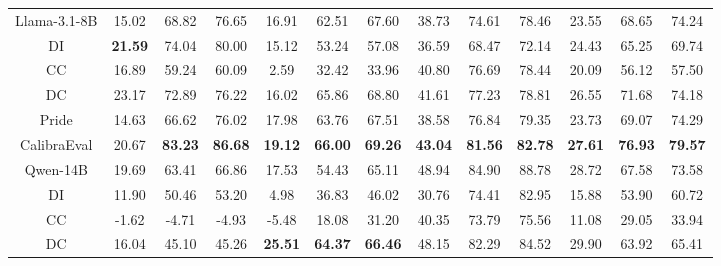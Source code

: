 \documentclass[sigconf]{acmart}
\begin{document}
\begin{table}[]
\begin{tabular}{c|ccc|ccc|ccc|ccc}
Llama-3.1-8B           & 15.02          & 68.82          & 76.65          & 16.91          & 62.51          & 67.60          & 38.73          & 74.61          & 78.46          & 23.55          & 68.65          & 74.24          \\
DI                     & \textbf{21.59} & 74.04          & 80.00          & 15.12          & 53.24          & 57.08          & 36.59          & 68.47          & 72.14          & 24.43          & 65.25          & 69.74          \\
CC                     & 16.89          & 59.24          & 60.09          & 2.59           & 32.42          & 33.96          & 40.80          & 76.69          & 78.44          & 20.09          & 56.12          & 57.50          \\
DC                     & 23.17          & 72.89          & 76.22          & 16.02          & 65.86          & 68.80          & 41.61          & 77.23          & 78.81          & 26.55          & 71.68          & 74.18          \\
Pride                  & 14.63          & 66.62          & 76.02          & 17.98          & 63.76          & 67.51          & 38.58          & 76.84          & 79.35          & 23.73          & 69.07          & 74.29          \\
CalibraEval            & 20.67          & \textbf{83.23} & \textbf{86.68} & \textbf{19.12} & \textbf{66.00} & \textbf{69.26} & \textbf{43.04} & \textbf{81.56} & \textbf{82.78} & \textbf{27.61} & \textbf{76.93} & \textbf{79.57} \\ \hline
Qwen-14B               & 19.69          & 63.41          & 66.86          & 17.53          & 54.43          & 65.11          & 48.94          & 84.90          & 88.78          & 28.72          & 67.58          & 73.58          \\
DI                     & 11.90          & 50.46          & 53.20          & 4.98           & 36.83          & 46.02          & 30.76          & 74.41          & 82.95          & 15.88          & 53.90          & 60.72          \\
CC                     & -1.62          & -4.71          & -4.93          & -5.48          & 18.08          & 31.20          & 40.35          & 73.79          & 75.56          & 11.08          & 29.05          & 33.94          \\
DC                     & 16.04          & 45.10          & 45.26          & \textbf{25.51} & \textbf{64.37} & \textbf{66.46} & 48.15          & 82.29          & 84.52          & 29.90          & 63.92          & 65.41          \\

\end{tabular}
\end{table}
\end{document}
